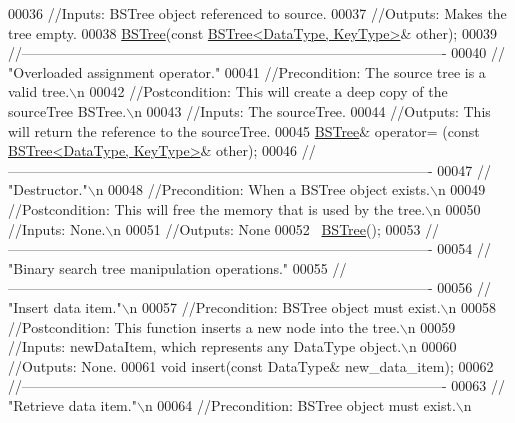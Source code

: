 \begin{DoxyCode}
00036     \textcolor{comment}{//Inputs: BSTree object referenced to source.}
00037     \textcolor{comment}{//Outputs: Makes the tree empty.}
00038     \hyperlink{class_b_s_tree}{BSTree}(\textcolor{keyword}{const} \hyperlink{class_b_s_tree}{BSTree<DataType, KeyType>}& other);   
00039     \textcolor{comment}{//-------------------------------------------------------------------------------------------}
00040     \textcolor{comment}{// "Overloaded assignment operator."}
00041     \textcolor{comment}{//Precondition: The source tree is a valid tree.\(\backslash\)n}
00042     \textcolor{comment}{//Postcondition: This will create a deep copy of the sourceTree BSTree.\(\backslash\)n}
00043     \textcolor{comment}{//Inputs: The sourceTree.}
00044     \textcolor{comment}{//Outputs: This will return the reference to the sourceTree.}
00045     \hyperlink{class_b_s_tree}{BSTree}& operator= (\textcolor{keyword}{const} \hyperlink{class_b_s_tree}{BSTree<DataType, KeyType>}& other);
00046     \textcolor{comment}{//-------------------------------------------------------------------------------------------}
00047     \textcolor{comment}{// "Destructor."\(\backslash\)n}
00048     \textcolor{comment}{//Precondition: When a BSTree object exists.\(\backslash\)n}
00049     \textcolor{comment}{//Postcondition: This will free the memory that is used by the tree.\(\backslash\)n}
00050     \textcolor{comment}{//Inputs: None.\(\backslash\)n}
00051     \textcolor{comment}{//Outputs: None}
00052     ~\hyperlink{class_b_s_tree}{BSTree}();
00053     \textcolor{comment}{//-------------------------------------------------------------------------------------------}
00054     \textcolor{comment}{// "Binary search tree manipulation operations."}
00055     \textcolor{comment}{//-------------------------------------------------------------------------------------------}
00056     \textcolor{comment}{// "Insert data item."\(\backslash\)n}
00057     \textcolor{comment}{//Precondition: BSTree object must exist.\(\backslash\)n}
00058     \textcolor{comment}{//Postcondition: This function inserts a new node into the tree.\(\backslash\)n}
00059     \textcolor{comment}{//Inputs: newDataItem, which represents any DataType object.\(\backslash\)n}
00060     \textcolor{comment}{//Outputs: None.}
00061     \textcolor{keywordtype}{void} insert(\textcolor{keyword}{const} DataType& new\_data\_item);
00062     \textcolor{comment}{//-------------------------------------------------------------------------------------------}
00063     \textcolor{comment}{// "Retrieve data item."\(\backslash\)n}
00064     \textcolor{comment}{//Precondition: BSTree object must exist.\(\backslash\)n}

\end{DoxyCode}
